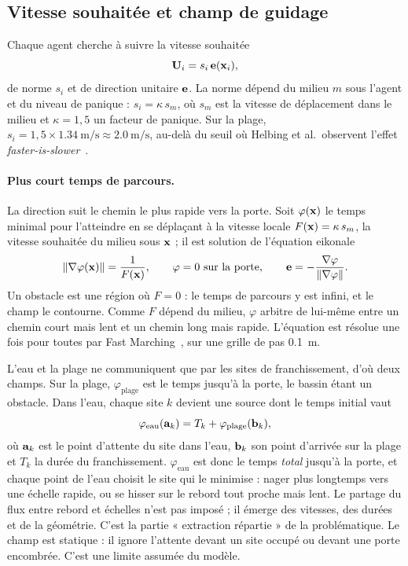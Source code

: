 \subsection{Vitesse souhaitée et champ de guidage}
\label{sec:guidage}

Chaque agent cherche à suivre la vitesse souhaitée
\begin{equation}
\label{eq:vitesse-souhaitee}
\mathbf{U}_i = s_i\,\mathbf{e}(\mathbf{x}_i),
\end{equation}
de norme $s_i$ et de direction unitaire $\mathbf{e}$. La norme dépend du milieu
$m$ sous l'agent et du niveau de panique : $s_i=\kappa\,s_m$, où $s_m$ est la
vitesse de déplacement dans le milieu et $\kappa=1{,}5$ un facteur de panique.
Sur la plage, $s_i=1{,}5\times\SI{1.34}{\metre\per\second}\approx\SI{2.0}{\metre\per\second}$,
au-delà du seuil où Helbing et al.\ observent l'effet \emph{faster-is-slower}~\cite{helbing2000}.

\paragraph{Plus court temps de parcours.}
La direction suit le chemin le plus rapide vers la porte. Soit $\varphi(\mathbf{x})$
le temps minimal pour l'atteindre en se déplaçant à la vitesse locale
$F(\mathbf{x})=\kappa\,s_m$, la vitesse souhaitée du milieu sous $\mathbf{x}$ ; il est
solution de l'équation eikonale
\begin{equation}
\label{eq:eikonale}
\left\lVert \nabla\varphi(\mathbf{x}) \right\rVert=\frac{1}{F(\mathbf{x})},
\qquad \varphi=0 \text{ sur la porte},
\qquad \mathbf{e}=-\frac{\nabla\varphi}{\left\lVert \nabla\varphi \right\rVert} .
\end{equation}
Un obstacle est une région où $F=0$ : le temps de parcours y est infini, et le
champ le contourne. Comme $F$ dépend du milieu, $\varphi$ arbitre de lui-même
entre un chemin court mais lent et un chemin long mais rapide. L'équation est
résolue une fois pour toutes par Fast Marching~\cite{sethian1996}, sur une
grille de pas \SI{0.1}{\metre}.

L'eau et la plage ne communiquent que par les sites de franchissement, d'où
deux champs. Sur la plage, $\varphi_{\text{plage}}$ est le temps jusqu'à la
porte, le bassin étant un obstacle. Dans l'eau, chaque site $k$ devient une
source dont le temps initial vaut
\begin{equation}
\label{eq:phi-eau}
\varphi_{\text{eau}}(\mathbf{a}_k)=T_k+\varphi_{\text{plage}}(\mathbf{b}_k),
\end{equation}
où $\mathbf{a}_k$ est le point d'attente du site dans l'eau, $\mathbf{b}_k$ son
point d'arrivée sur la plage et $T_k$ la durée du franchissement.
$\varphi_{\text{eau}}$ est donc le temps \emph{total} jusqu'à la porte, et chaque
point de l'eau choisit le site qui le minimise : nager plus longtemps vers une
échelle rapide, ou se hisser sur le rebord tout proche mais lent. Le partage du
flux entre rebord et échelles n'est pas imposé ; il émerge des vitesses, des
durées et de la géométrie. C'est la partie « extraction répartie » de la
problématique. Le champ est statique : il ignore l'attente devant un site occupé
ou devant une porte encombrée. C'est une limite assumée du modèle.

